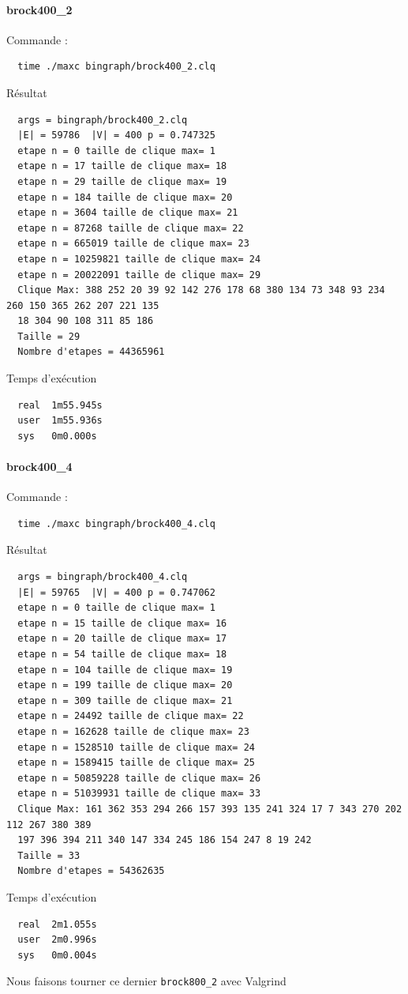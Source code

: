 \documentclass{article}
\begin{document}
\paragraph{brock400\_2}
Commande :
\begin{verbatim}
  time ./maxc bingraph/brock400_2.clq
\end{verbatim}
Résultat
\begin{verbatim}
  args = bingraph/brock400_2.clq
  |E| = 59786  |V| = 400 p = 0.747325
  etape n = 0 taille de clique max= 1
  etape n = 17 taille de clique max= 18
  etape n = 29 taille de clique max= 19
  etape n = 184 taille de clique max= 20
  etape n = 3604 taille de clique max= 21
  etape n = 87268 taille de clique max= 22
  etape n = 665019 taille de clique max= 23
  etape n = 10259821 taille de clique max= 24
  etape n = 20022091 taille de clique max= 29
  Clique Max: 388 252 20 39 92 142 276 178 68 380 134 73 348 93 234 260 150 365 262 207 221 135
  18 304 90 108 311 85 186
  Taille = 29
  Nombre d'etapes = 44365961
\end{verbatim}
Temps d'exécution
\begin{verbatim}
  real  1m55.945s
  user  1m55.936s
  sys   0m0.000s
\end{verbatim}
\paragraph{brock400\_4}
Commande :
\begin{verbatim}
  time ./maxc bingraph/brock400_4.clq
\end{verbatim}
Résultat
\begin{verbatim}
  args = bingraph/brock400_4.clq
  |E| = 59765  |V| = 400 p = 0.747062
  etape n = 0 taille de clique max= 1
  etape n = 15 taille de clique max= 16
  etape n = 20 taille de clique max= 17
  etape n = 54 taille de clique max= 18
  etape n = 104 taille de clique max= 19
  etape n = 199 taille de clique max= 20
  etape n = 309 taille de clique max= 21
  etape n = 24492 taille de clique max= 22
  etape n = 162628 taille de clique max= 23
  etape n = 1528510 taille de clique max= 24
  etape n = 1589415 taille de clique max= 25
  etape n = 50859228 taille de clique max= 26
  etape n = 51039931 taille de clique max= 33
  Clique Max: 161 362 353 294 266 157 393 135 241 324 17 7 343 270 202 112 267 380 389
  197 396 394 211 340 147 334 245 186 154 247 8 19 242
  Taille = 33
  Nombre d'etapes = 54362635
\end{verbatim}
Temps d'exécution
\begin{verbatim}
  real  2m1.055s
  user  2m0.996s
  sys   0m0.004s
\end{verbatim}
Nous faisons tourner ce dernier \texttt{brock800\_2} avec Valgrind
\end{document}
